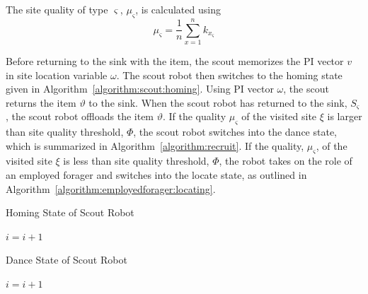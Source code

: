 \documentclass[preprint,12pt]{elsarticle}
\begin{document}
The site quality of type $\varsigma$, $\mu_\varsigma$, is calculated using
\begin{equation}
\label{density}
\mu_\varsigma = \frac{1}{n}\sum\limits_{x=1}^n k_{x_\varsigma}
\end{equation}
 
Before returning to the sink with the item, the scout memorizes the PI vector $v$ in site location variable $\omega$. The scout robot then switches to the homing state given in Algorithm~\ref{algorithm:scout:homing}. Using PI vector $\omega$, the scout returns the item $\vartheta$ to the sink. When the scout robot has returned to the sink, $S_\varsigma$, the scout robot offloads the item $\vartheta$. If the quality $\mu_\varsigma$ of the visited site $\xi$ is larger than site quality threshold, $\Phi$, the scout robot switches into the dance state, which is summarized in Algorithm~\ref{algorithm:recruit}. If the quality, $\mu_\varsigma$, of the visited site $\xi$ is less than site quality threshold, $\Phi$, the robot takes on the role of an employed forager and switches into the locate state, as outlined in Algorithm~\ref{algorithm:employedforager:locating}.


\begin{algorithm}
\caption{Homing State of Scout Robot}
\label{algorithm:scout:homing}
\begin{algorithmic}[1]
	\State {}
		\State {}
	\Else 
		\State {}
		\State {}
	\EndIf
\Else
		\State {}
	\EndIf
\EndIf
\State $i =i + 1$
\EndFunction
\end{algorithmic}
\end{algorithm}


\begin{algorithm}
\caption{Dance State of Scout Robot}
\label{algorithm:recruit}
\begin{algorithmic}[1]
	\State {} 
\Else 
	\State {}
	\If {$\varrho < \rho$} 
	\Else
	\EndIf
\EndIf
\State $i =i + 1$
\EndFunction
\end{algorithmic}
\end{algorithm}
\end{document}
